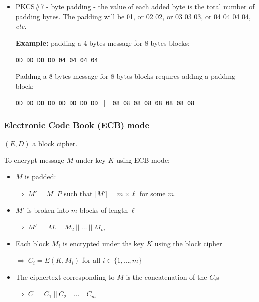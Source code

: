 \documentclass[aspectratio=169, lualatex, 10pt,dvipsnames,svgnames]{beamer} %
\def\envert#1{\textcolor{vert}{#1}}
\def\enbleu#1{\textcolor{bleu}{#1}}
\def\enrouge#1{\textcolor{rouge}{#1}}
\begin{document}
\begin{frame}
\begin{itemize}
    \texttt{\envert{DD DD DD DD DD DD DD DD $\|$ \enrouge{ 00 00 00 00 00 00 00 08}}}
    \medskip{}
    \pause

    \normalsize
 
  \item \enbleu{PKCS\#7 - } byte padding - the value of each added byte is the total number of padding bytes. The padding will be
    01, or 02 02, or 03 03 03, or 04 04 04 04, \emph{etc.}\smallskip

    \scriptsize

    \envert{\textbf{Example:} padding a 4-bytes message for 8-bytes blocks:}

    \texttt{\envert{DD DD DD DD {\enrouge{04 04 04 04}}}}\smallskip

    \envert{Padding a $8$-bytes message for 8-bytes blocks requires adding a padding block:}

    \texttt{\envert{DD DD DD DD DD DD DD DD $\|$ {\enrouge 08 08 08 08 08 08 08 08}}}

    \normalsize

  \end{itemize}

\end{frame}

\begin{frame}

  \frametitle{Electronic Code Book (ECB) mode}

  $(E, D)$ a block cipher.
  \pause
  \bigskip{}

  To encrypt message $M$ under key $K$ using ECB mode: 
  \pause

  \begin{itemize}
  \item $M$ is padded:

    \hspace{1cm}$\Rightarrow\ M' = M || P$ such that $|M'| = m\times \ell$ for some $m$.
    \pause
    \medskip{}
    
  \item $M'$ is broken into $m$ blocks of length $\ell$

    \hspace{1cm}$\Rightarrow\ M'\ = M_1\ ||\ M_2\ ||\ \dots\ ||\ M_m$
    \pause
    \medskip{}

  \item Each block $M_i$ is encrypted under the key $K$ using the block cipher

    \hspace{1cm}$\Rightarrow\ C_i = E(K, M_i)$ for all $i\in\{1, \dots, m\}$
    \pause
    \medskip{}

  \item The ciphertext corresponding to $M$ is the concatenation of the $C_i$s

    \hspace{1cm}$\Rightarrow\ C\ = C_1\ ||\ C_2\ ||\ \dots\ ||\ C_m$
  \end{itemize}

\end{frame}
\end{document}
